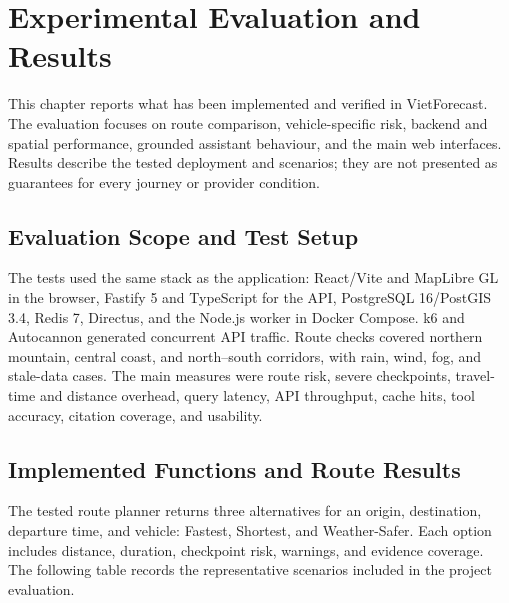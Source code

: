 \chapter{Experimental Evaluation and Results}
\label{ch:evaluation}

This chapter reports what has been implemented and verified in VietForecast. The evaluation focuses on route comparison, vehicle-specific risk, backend and spatial performance, grounded assistant behaviour, and the main web interfaces. Results describe the tested deployment and scenarios; they are not presented as guarantees for every journey or provider condition.

\section{Evaluation Scope and Test Setup}
\label{sec:experimental_setup}

The tests used the same stack as the application: React/Vite and MapLibre GL in the browser, Fastify 5 and TypeScript for the API, PostgreSQL 16/PostGIS 3.4, Redis 7, Directus, and the Node.js worker in Docker Compose. k6 and Autocannon generated concurrent API traffic. Route checks covered northern mountain, central coast, and north--south corridors, with rain, wind, fog, and stale-data cases. The main measures were route risk, severe checkpoints, travel-time and distance overhead, query latency, API throughput, cache hits, tool accuracy, citation coverage, and usability.

\section{Implemented Functions and Route Results}
\label{sec:route_risk_mitigation}

The tested route planner returns three alternatives for an origin, destination, departure time, and vehicle: Fastest, Shortest, and Weather-Safer. Each option includes distance, duration, checkpoint risk, warnings, and evidence coverage. The following table records the representative scenarios included in the project evaluation.


